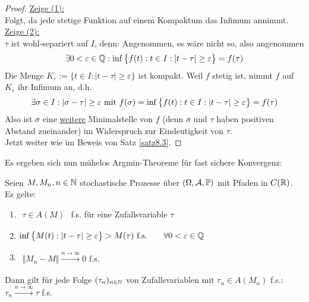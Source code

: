 
\begin{proof}
	\underline{Zeige (1):}\\
	Folgt, da jede stetige Funktion auf einem Kompaktum das Infimum annimmt.\nl
	\underline{Zeige (2):}\\
	$\tau$ ist wohl-separiert auf $I$, denn: 
	Angenommen, es wäre nicht so, also angenommen
	\begin{align*}
		\exists0<\varepsilon\in\Q:\inf\limits\big\lbrace f(t):t\in I:|t-\tau|\geq\varepsilon\big\rbrace=f(\tau)
	\end{align*}
	Die Menge $K_\varepsilon:=\lbrace t\in I:|t-\tau|\geq\varepsilon\rbrace$ ist kompakt.  
	Weil $f$ stetig ist, nimmt $f$ auf $K_\varepsilon$ ihr Infimum an, d.h.
	\begin{align*}
		\exists\sigma\in I:|\sigma-\tau|\geq\varepsilon\mit f(\sigma)=\inf\limits
		\big\lbrace f(t):t\in I:|t-\tau|\geq\varepsilon\big\rbrace
		=f(\tau)
	\end{align*}
	Also ist $\sigma$ eine \underline{weitere} Minimalstelle von $f$ (denn $\sigma$ und $\tau$ haben positiven Abstand zueinander) im Widerspruch zur Eindeutigkeit von $\tau$.\\
	Jetzt weiter wie im Beweis von Satz \ref{satz8.3}.
\end{proof}

Es ergeben sich nun mühelos Argmin-Theoreme für fast sichere Konvergenz:

\begin{satz}\label{satz8.5}
	Seien $M,M_n,n\in\N$ stochastische Prozesse über $(\Omega,\A,\P)$ mit Pfaden in $C(\R)$.
	Es gelte:
	\begin{enumerate}[label=(\arabic*)]
		\item $\begin{aligned}
			\tau\in A(M)
		\end{aligned}$ f.s. für eine Zufallsvariable $\tau$
		\item $\begin{aligned}
			\inf\limits\big\lbrace M(t):|t-\tau|\geq\varepsilon\big\rbrace>M(\tau)\text{ f.s.}\qquad\forall 0<\varepsilon\in\Q
		\end{aligned}$
		\item $\begin{aligned}
			\big\Vert M_n-M\big\Vert\overset{n\to\infty}{\longrightarrow}0\text{ f.s.}
		\end{aligned}$
	\end{enumerate}
	Dann gilt für jede Folge $(\tau_n)_{n\in\N}$ von Zufallsvariablen mit $\tau_n\in A(M_n)$ f.s.:
	$\tau_n\overset{n\to\infty}{\longrightarrow}\tau$ f.s.
\end{satz}


